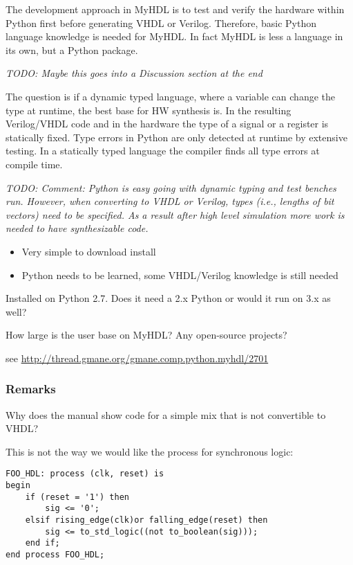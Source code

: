 \documentclass[10pt, conference, compsocconf]{IEEEtran}
\newcommand{\todo}[1]{{\emph{TODO: #1}}}
\begin{document}
The development approach in MyHDL is to test and verify the hardware within Python first
before generating VHDL or Verilog. Therefore, basic Python language knowledge is
needed for MyHDL. In fact MyHDL is less a language in its own, but a Python package.

\todo{Maybe this goes into a Discussion section at the end}

The question is if a dynamic typed language, where a variable can change the type
at runtime, the best base for HW synthesis is. In the resulting Verilog/VHDL code and
in the hardware the type of a signal or a register is statically fixed. Type errors in
Python are only detected at runtime by extensive testing. In a statically typed
language the compiler finds all type errors at compile time.

\todo{Comment: Python is easy going with dynamic typing and test benches run.
However, when converting to VHDL or Verilog, types (i.e., lengths of bit vectors)
need to be specified. As a result after high level simulation more work is needed
to have synthesizable code.}





\begin{itemize}
\item Very simple to download install
\item Python needs to be learned, some VHDL/Verilog knowledge is still needed
\end{itemize}

Installed on Python 2.7. Does it need a 2.x Python or would it run on 3.x as well?

How large is the user base on MyHDL? Any open-source projects?

see \url{http://thread.gmane.org/gmane.comp.python.myhdl/2701}

\subsubsection{Remarks}

Why does the manual show code for a simple mix that is not convertible to VHDL?

This is not the way we would like the process for synchronous logic:

\begin{verbatim}
FOO_HDL: process (clk, reset) is
begin
    if (reset = '1') then
        sig <= '0';
    elsif rising_edge(clk)or falling_edge(reset) then
        sig <= to_std_logic((not to_boolean(sig)));
    end if;
end process FOO_HDL;
\end{verbatim}
\end{document}
